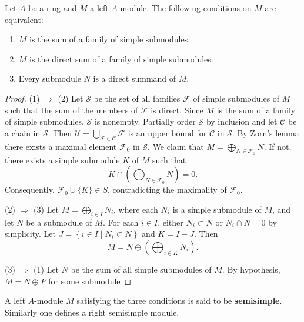 \begin{theorem}
    \label{thm: Semisimple modules}
    Let $A$ be a ring and $M$ a left $A$-module.
    The following conditions on $M$ are equivalent:
    \begin{enumerate}
        \item
              $M$ is the sum of a family of simple submodules.
        \item

              $M$ is the direct sum of a family of simple submodules.
        \item
              Every submodule $N$ is a direct summand of $M$.
    \end{enumerate}
    \begin{proof}
        (1) $\Rightarrow$ (2)
        Let $\mathcal{S}$ be the set of all families $\mathcal{F}$ of simple submodules of $M$ such that the sum of the members of $\mathcal{F}$ is direct.
        Since $M$ is the sum of a family of simple submodules, $\mathcal{S}$ is nonempty.
        Partially order $\mathcal{S}$ by inclusion and let $\mathcal{C}$ be a chain in $\mathcal{S}$.
        Then $\mathcal{U}=\bigcup_{\mathcal{F} \in \mathcal{C}} \mathcal{F}$ is an upper bound for $\mathcal{C}$ in $\mathcal{S}$.
        By Zorn's lemma there exists a maximal element $\mathcal{F}_0$ in $\mathcal{S}$.
        We claim that $M=\bigoplus_{N \in \mathcal{F}_0} N$.
        If not, there exists a simple submodule $K$ of $M$ such that
        \begin{equation*}
            K \cap\left(\bigoplus_{N \in \mathcal{F}_0} N\right)=0 .
        \end{equation*}
        Consequently, $\mathcal{F}_0 \cup\{K\} \in S$, contradicting the maximality of $\mathcal{F}_0$.

        (2) $\Rightarrow$ (3)
        Let $M=\bigoplus_{i \in I} N_i$, where each $N_i$ is a simple submodule of $M$, and let $N$ be a submodule of $M$.
        For each $i \in I$, either $N_i \subset N$ or $N_i \cap N=0$ by simplicity.
        Let $J=\left\{i \in I \mid N_i \subset N\right\}$ and $K=I-J$. Then
        \begin{equation*}
            M=N \oplus\left(\bigoplus_{i \in K} N_i\right) .
        \end{equation*}

        (3) $\Rightarrow$ (1)
        Let $N$ be the sum of all simple submodules of $M$. By hypothesis, $M=N \oplus P$ for some submodule
    \end{proof}

    \begin{remark}
        A left $A$-module $M$ satisfying the three conditions is said to be \textbf{semisimple}.
        Similarly one defines a right semisimple module.
    \end{remark}
\end{theorem}


